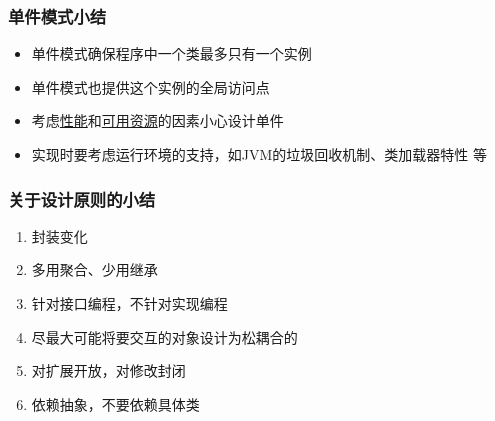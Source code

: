 \documentclass[compress]{beamer}
\begin{document}
\begin{frame}
  \frametitle{单件模式小结}
  \begin{itemize}
    \item 单件模式确保程序中一个类最多只有一个实例
    \item 单件模式也提供这个实例的全局访问点
    \item 考虑\uline{性能}和\uline{可用资源}的因素小心设计单件
    \item 实现时要考虑运行环境的支持，如JVM的垃圾回收机制、类加载器特性
      等
  \end{itemize}
\end{frame}

\begin{frame}
\frametitle{关于设计原则的小结}
  \begin{enumerate}
    \item 封装变化
    \item 多用聚合、少用继承
    \item 针对接口编程，不针对实现编程
    \item 尽最大可能将要交互的对象设计为松耦合的
    \item 对扩展开放，对修改封闭
    \item 依赖抽象，不要依赖具体类
  \end{enumerate}
\end{frame}
\end{document}
